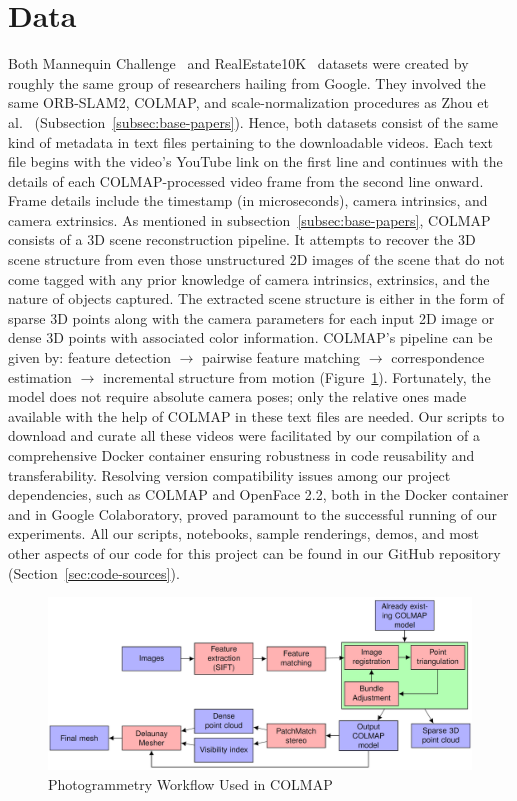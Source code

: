 \section{Data}\label{sec:data} 

Both Mannequin Challenge~\cite{li2019learning} and RealEstate10K~\cite{zhou2018stereo} datasets were created by roughly the same group of researchers hailing from Google. They involved the same ORB-SLAM2, COLMAP, and scale-normalization procedures as Zhou et al.~\cite{zhou2018stereo} (Subsection~\ref{subsec:base-papers}). Hence, both datasets consist of the same kind of metadata in text files pertaining to the downloadable videos. Each text file begins with the video’s YouTube link on the first line and continues with the details of each COLMAP-processed video frame from the second line onward. Frame details include the timestamp (in microseconds), camera intrinsics, and camera extrinsics. As mentioned in subsection~\ref{subsec:base-papers}, COLMAP consists of a 3D scene reconstruction pipeline. It attempts to recover the 3D scene structure from even those unstructured 2D images of the scene that do not come tagged with any prior knowledge of camera intrinsics, extrinsics, and the nature of objects captured. The extracted scene structure is either in the form of sparse 3D points along with the camera parameters for each input 2D image or dense 3D points with associated color information. COLMAP's pipeline can be given by: feature detection $\rightarrow$ pairwise feature matching  $\rightarrow$ correspondence estimation $\rightarrow$ incremental structure from motion (Figure~\ref{fig:colmap-photogrammetry-pipeline}). Fortunately, the model does not require absolute camera poses; only the relative ones made available with the help of COLMAP in these text files are needed. Our scripts to download and curate all these videos were facilitated by our compilation of a comprehensive Docker container ensuring robustness in code reusability and transferability. Resolving version compatibility issues among our project dependencies, such as COLMAP and OpenFace 2.2, both in the Docker container and in Google Colaboratory, proved paramount to the successful running of our experiments. All our scripts, notebooks, sample renderings, demos, and most other aspects of our code for this project can be found in our GitHub repository (Section~\ref{sec:code-sources}).

\begin{figure}[!h]
    \includegraphics[width=1\columnwidth]{figures/colmap-photogrammetry-pipeline.png}
    \caption{Photogrammetry Workflow Used in COLMAP~\cite{pinard_does_2021}}
    \label{fig:colmap-photogrammetry-pipeline}
\end{figure}
    
